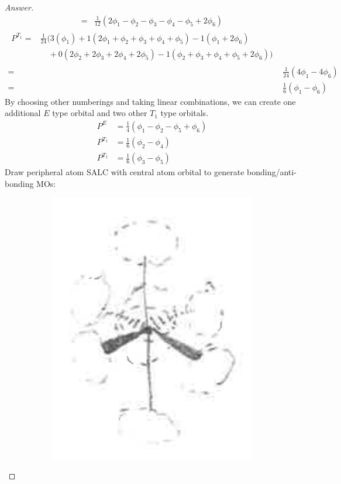 \documentclass[../psets.tex]{subfiles}
\begin{document}
\begin{enumerate}[label={\Roman*)}]
\begin{enumerate}[label={\alph*)}]
\begin{proof}[Answer]
\begin{align*}
                ={}& \frac{1}{12}(2\phi_1-\phi_2-\phi_3-\phi_4-\phi_5+2\phi_6)
            \end{align*}
            \begin{align*}
                \begin{split}
                    P^{T_1} ={}& \frac{1}{24}(3(\phi_1)+1(2\phi_1+\phi_2+\phi_3+\phi_4+\phi_5)-1(\phi_1+2\phi_6)\\
                    &\quad +0(2\phi_2+2\phi_3+2\phi_4+2\phi_5)-1(\phi_2+\phi_3+\phi_4+\phi_5+2\phi_6))
                \end{split}\\
                ={}& \frac{1}{24}(4\phi_1-4\phi_6)\\
                ={}& \frac{1}{6}(\phi_1-\phi_6)
            \end{align*}
            By choosing other numberings and taking linear combinations, we can create one additional $E$ type orbital and two other $T_1$ type orbitals.
            \begin{align*}
                P^{E} &= \frac{1}{4}(\phi_1-\phi_2-\phi_5+\phi_6)\\
                P^{T_1} &= \frac{1}{6}(\phi_2-\phi_4)\\
                P^{T_1} &= \frac{1}{6}(\phi_3-\phi_5)
            \end{align*}
            Draw peripheral atom SALC with central atom orbital to generate bonding/anti-bonding MOs:
            \begin{figure}[H]
                \centering
                \begin{subfigure}[b]{0.24\linewidth}
                    \centering
                    \includegraphics[width=0.7\linewidth]{../ExtFiles/SALC-SF6a.png}

\end{subfigure}
\end{figure}
\end{proof}
\end{enumerate}
\end{enumerate}
\end{document}
